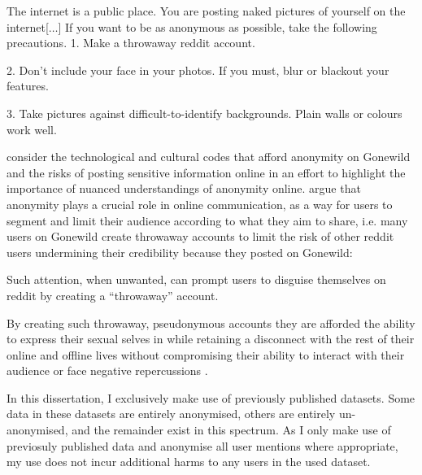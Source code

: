 \begin{aquote}{\cite{Nagel:2013}}
The internet is a public place. You are posting naked pictures of yourself on the internet[$\ldots$] If you want to be as anonymous as possible, take the following precautions.
1. Make a throwaway reddit account.

2. Don't include your face in your photos. If you must, blur or blackout your features.

3. Take pictures against difficult-to-identify backgrounds. Plain walls or colours work well.
\end{aquote}

\cite{Nagel:2013} consider the technological and cultural codes that afford anonymity on Gonewild and the risks of posting sensitive information online in an effort to highlight the importance of nuanced understandings of anonymity online. \cite{Nagel:2013} argue that anonymity plays a crucial role in online communication, as a way for users to segment and limit their audience according to what they aim to share, i.e. many users on Gonewild create throwaway accounts to limit the risk of other reddit users undermining their credibility because they posted on Gonewild:

\begin{aquote}{\cite{Nagel:2013}}
Such attention, when unwanted, can prompt users to disguise themselves on reddit by creating a ``throwaway'' account.
\end{aquote}

By creating such throwaway, pseudonymous accounts they are afforded the ability to express their sexual selves in while retaining a disconnect with the rest of their online and offline lives without compromising their ability to interact with their audience or face negative repercussions \citep{Nagel:2015}.\vspace{5mm}

In this dissertation, I exclusively make use of previously published datasets. Some data in these datasets are entirely anonymised, others are entirely un-anonymised, and the remainder exist in this spectrum. As I only make use of previosuly published data and anonymise all user mentions where appropriate, my use does not incur additional harms to any users in the used dataset.


